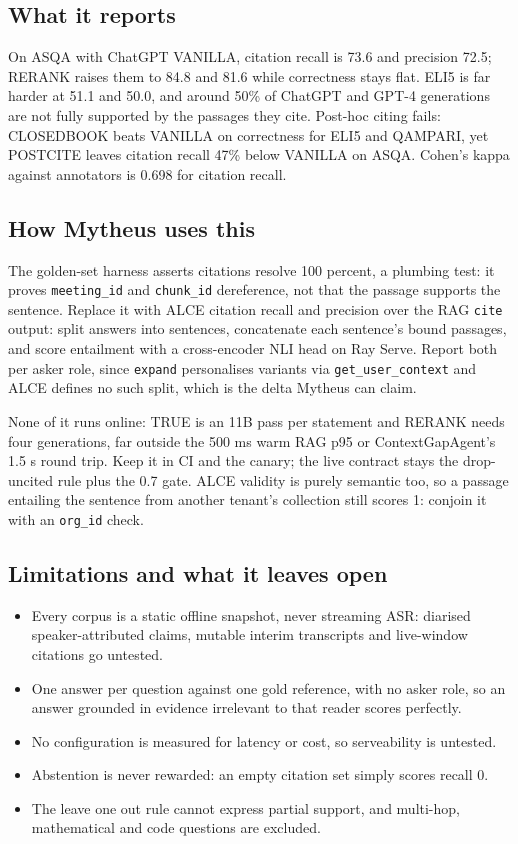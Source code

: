 \subsection{What it reports}

On ASQA with ChatGPT VANILLA, citation recall is 73.6 and precision 72.5; RERANK raises them to 84.8 and 81.6 while correctness stays flat. ELI5 is far harder at 51.1 and 50.0, and around 50\% of ChatGPT and GPT-4 generations are not fully supported by the passages they cite. Post-hoc citing fails: CLOSEDBOOK beats VANILLA on correctness for ELI5 and QAMPARI, yet POSTCITE leaves citation recall 47\% below VANILLA on ASQA. Cohen's kappa against annotators is 0.698 for citation recall.

\subsection{How Mytheus uses this}
\begin{takeaway}
The golden-set harness asserts citations resolve 100 percent, a plumbing test: it proves \texttt{meeting\_id} and \texttt{chunk\_id} dereference, not that the passage supports the sentence. Replace it with ALCE citation recall and precision over the RAG \texttt{cite} output: split answers into sentences, concatenate each sentence's bound passages, and score entailment with a cross-encoder NLI head on Ray Serve. Report both per asker role, since \texttt{expand} personalises variants via \texttt{get\_user\_context} and ALCE defines no such split, which is the delta Mytheus can claim.

None of it runs online: TRUE is an 11B pass per statement and RERANK needs four generations, far outside the 500 ms warm RAG p95 or ContextGapAgent's 1.5 s round trip. Keep it in CI and the canary; the live contract stays the drop-uncited rule plus the 0.7 gate. ALCE validity is purely semantic too, so a passage entailing the sentence from another tenant's collection still scores 1: conjoin it with an \texttt{org\_id} check.
\end{takeaway}

\subsection{Limitations and what it leaves open}
\begin{itemize}\itemsep0pt\parskip0pt
  \item Every corpus is a static offline snapshot, never streaming ASR: diarised speaker-attributed claims, mutable interim transcripts and live-window citations go untested.
  \item One answer per question against one gold reference, with no asker role, so an answer grounded in evidence irrelevant to that reader scores perfectly.
  \item No configuration is measured for latency or cost, so serveability is untested.
  \item Abstention is never rewarded: an empty citation set simply scores recall 0.
  \item The leave one out rule cannot express partial support, and multi-hop, mathematical and code questions are excluded.
\end{itemize}
